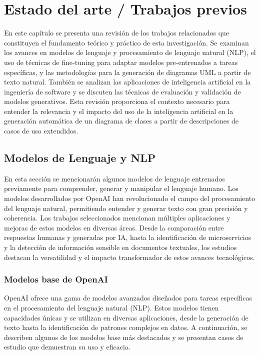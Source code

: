 \label{chapter:estado-arte}\chapter[Estado del arte]{Estado del arte / Trabajos previos}

En este capítulo se presenta una revisión de los trabajos relacionados que constituyen el fundamento teórico y práctico de esta investigación. Se examinan los avances en modelos de lenguaje y procesamiento de lenguaje natural (NLP), el uso de técnicas de fine-tuning para adaptar modelos pre-entrenados a tareas específicas, y las metodologías para la generación de diagramas UML a partir de texto natural. También se analizan las aplicaciones de inteligencia artificial en la ingeniería de software y se discuten las técnicas de evaluación y validación de modelos generativos. Esta revisión proporciona el contexto necesario para entender la relevancia y el impacto del uso de la inteligencia artificial en la generación automática de un diagrama de clases a partir de descripciones de casos de uso extendidos.

\section{Modelos de Lenguaje y NLP}

En esta sección se mencionarán algunos modelos de lenguaje entrenados previamente para comprender, generar y manipular el lenguaje humano. Los modelos desarrollados por OpenAI han revolucionado el campo del procesamiento del lenguaje natural, permitiendo entender y generar texto con gran precisión y coherencia. Los trabajos seleccionados mencionan múltiples aplicaciones y mejoras de estos modelos en diversas áreas. Desde la comparación entre respuestas humanas y generadas por IA, hasta la identificación de microservicios y la detección de información sensible en documentos textuales, los estudios destacan la versatilidad y el impacto transformador de estos avances tecnológicos.

\subsection{Modelos base de OpenAI}

OpenAI ofrece una gama de modelos avanzados diseñados para tareas específicas en el procesamiento del lenguaje natural (NLP). Estos modelos tienen capacidades únicas y se utilizan en diversas aplicaciones, desde la generación de texto hasta la identificación de patrones complejos en datos. A continuación, se describen algunos de los modelos base más destacados y se presentan casos de estudio que demuestran su uso y eficacia. 

